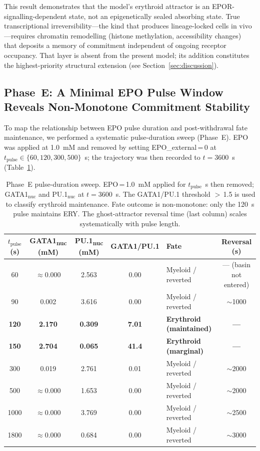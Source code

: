 This result demonstrates that the model's erythroid attractor is an EPOR-signalling-dependent state, not an epigenetically sealed absorbing state. True transcriptional irreversibility---the kind that produces lineage-locked cells in vivo---requires chromatin remodelling (histone methylation, accessibility changes) that deposits a memory of commitment independent of ongoing receptor occupancy. That layer is absent from the present model; its addition constitutes the highest-priority structural extension (see Section~\ref{sec:discussion}).

\subsection{Phase~E: A Minimal EPO Pulse Window Reveals Non-Monotone Commitment Stability}

To map the relationship between EPO pulse duration and post-withdrawal fate maintenance, we performed a systematic pulse-duration sweep (Phase~E). EPO was applied at 1.0~mM and removed by setting EPO\_external\,=\,0 at $t_{\mathrm{pulse}} \in \{60, 120, 300, 500\}$~s; the trajectory was then recorded to $t=3600$~s (Table~\ref{tab:phaseE}).

\begin{table}[ht]
\caption{Phase~E pulse-duration sweep. EPO\,=\,1.0~mM applied for $t_{\mathrm{pulse}}$~s then removed; GATA1$_\text{nuc}$ and PU.1$_\text{nuc}$ at $t=3600$~s. The GATA1/PU.1 threshold $>$\,1.5 is used to classify erythroid maintenance. Fate outcome is non-monotone: only the 120~s pulse maintains ERY. The ghost-attractor reversal time (last column) scales systematically with pulse length.}
\label{tab:phaseE}
\centering
\small
\begin{tabularx}{\linewidth}{@{}cccclc@{}}
\toprule
\textbf{$t_{\mathrm{pulse}}$ (s)} & \textbf{GATA1\textsubscript{nuc} (mM)} & \textbf{PU.1\textsubscript{nuc} (mM)} & \textbf{GATA1/PU.1} & \textbf{Fate} & \textbf{Reversal (s)} \\
\midrule
60  & $\approx$0.000 & 2.563 & 0.00 & Myeloid / reverted & --- (basin not entered) \\
90  & 0.002 & 3.616 & 0.00 & Myeloid / reverted & $\sim$1000 \\
\textbf{120} & \textbf{2.170} & \textbf{0.309} & \textbf{7.01} & \textbf{Erythroid (maintained)} & \textbf{---} \\
\textbf{150} & \textbf{2.704} & \textbf{0.065} & \textbf{41.4} & \textbf{Erythroid (marginal)} & \textbf{---} \\
300 & 0.019 & 2.761 & 0.01 & Myeloid / reverted & $\sim$2000 \\
500 & $\approx$0.000 & 1.653 & 0.00 & Myeloid / reverted & $\sim$2000 \\
1000 & $\approx$0.000 & 3.769 & 0.00 & Myeloid / reverted & $\sim$2500 \\
1800 & $\approx$0.000 & 0.684 & 0.00 & Myeloid / reverted & $\sim$3000 \\
\bottomrule
\end{tabularx}
\end{table}

